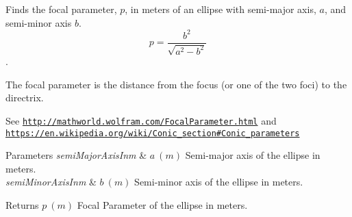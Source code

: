 Finds the focal parameter, $p$, in meters of an ellipse with semi-\/major axis, $a$, and semi-\/minor axis $b$. \[ p=\frac{b^2}{\sqrt{a^2-b^2}} \]. 

The focal parameter is the distance from the focus (or one of the two foci) to the directrix.

See \href{http://mathworld.wolfram.com/FocalParameter.html}{\tt http\+://mathworld.\+wolfram.\+com/\+Focal\+Parameter.\+html} and \href{https://en.wikipedia.org/wiki/Conic_section#Conic_parameters}{\tt https\+://en.\+wikipedia.\+org/wiki/\+Conic\+\_\+section\#\+Conic\+\_\+parameters}


\begin{DoxyParams}{Parameters}
{\em semi\+Major\+Axis\+Inm} & $ a\ (m)$ Semi-\/major axis of the ellipse in meters. \\
\hline
{\em semi\+Minor\+Axis\+Inm} & $ b\ (m)$ Semi-\/minor axis of the ellipse in meters. \\
\hline
\end{DoxyParams}
\begin{DoxyReturn}{Returns}
$ p\ (m)$ Focal Parameter of the ellipse in meters. 
\end{DoxyReturn}
